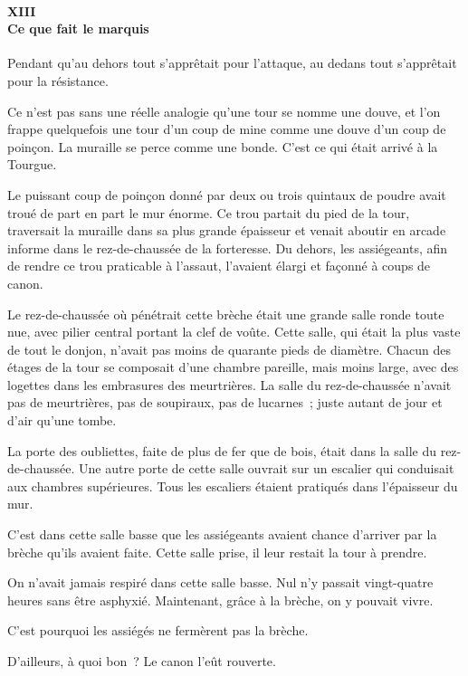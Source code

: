 \documentclass[french,twoside]{book} %
\begin{document}
 \paragraph[{XIII. Ce que fait le marquis}]{XIII \\
Ce que fait le marquis}
\label{p3l2c13}
\noindent Pendant qu’au dehors tout s’apprêtait pour l’attaque, au dedans tout s’apprêtait pour la résistance.\par
Ce n’est pas sans une réelle analogie qu’une tour se nomme une douve, et l’on frappe quelquefois une tour d’un coup de mine comme une douve d’un coup de poinçon. La muraille se perce comme une bonde. C’est ce qui était arrivé à la Tourgue.\par
Le puissant coup de poinçon donné par deux ou trois quintaux de poudre avait troué de part en part le mur énorme. Ce trou partait du pied de la tour, traversait la muraille dans sa plus grande épaisseur et venait aboutir en arcade informe dans le rez-de-chaussée de la forteresse. Du dehors, les assiégeants, afin de rendre ce trou praticable à l’assaut, l’avaient élargi et façonné à coups de canon.\par
Le rez-de-chaussée où pénétrait cette brèche était une grande salle ronde toute nue, avec pilier central portant la clef de voûte. Cette salle, qui était la plus vaste de tout le donjon, n’avait pas moins de quarante pieds de diamètre. Chacun des étages de la tour se composait d’une chambre pareille, mais moins large, avec des logettes dans les embrasures des meurtrières. La salle du rez-de-chaussée n’avait pas de meurtrières,  pas de soupiraux, pas de lucarnes ; juste autant de jour et d’air qu’une tombe.\par
La porte des oubliettes, faite de plus de fer que de bois, était dans la salle du rez-de-chaussée. Une autre porte de cette salle ouvrait sur un escalier qui conduisait aux chambres supérieures. Tous les escaliers étaient pratiqués dans l’épaisseur du mur.\par
C’est dans cette salle basse que les assiégeants avaient chance d’arriver par la brèche qu’ils avaient faite. Cette salle prise, il leur restait la tour à prendre.\par
On n’avait jamais respiré dans cette salle basse. Nul n’y passait vingt-quatre heures sans être asphyxié. Maintenant, grâce à la brèche, on y pouvait vivre.\par
C’est pourquoi les assiégés ne fermèrent pas la brèche.\par
D’ailleurs, à quoi bon ? Le canon l’eût rouverte.\par
\end{document}
